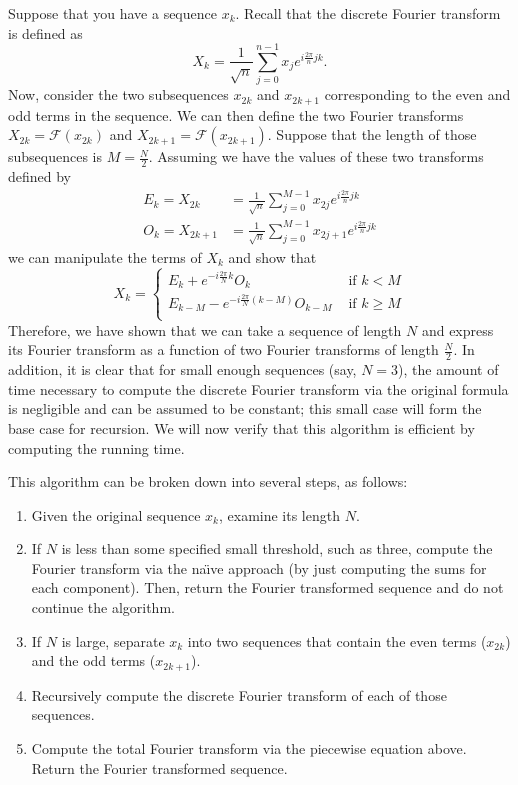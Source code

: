 \documentclass[11pt]{article}
\newcommand\del[1]{\left(#1\right)}
\newcommand\nicefrac[2]{\frac{#1}{#2}}
\newcommand\cF{\mathcal{F}}
\begin{document}
Suppose that you have a sequence $x_k$. Recall that the discrete Fourier transform is defined as
\[X_k = \frac{1}{\sqrt{n}} \sum_{j=0}^{n-1} x_j e^{i\frac{2\pi}{n} jk}.\]
Now, consider the two subsequences $x_{2k}$ and $x_{2k+1}$ corresponding to the even and odd terms
in the sequence. We can then define the two Fourier transforms $X_{2k} = \cF(x_{2k})$ and $X_{2k+1}
= \cF(x_{2k+1})$. Suppose that the length of those subsequences is $M=\nicefrac{N}{2}$. Assuming we
have the values of these two transforms defined by
\begin{align*}
    E_k = X_{2k} &= \frac{1}{\sqrt{n}} \sum_{j=0}^{M-1} x_{2j} e^{i\frac{2\pi}{n} jk} \\
    O_k = X_{2k+1} &= \frac{1}{\sqrt{n}} \sum_{j=0}^{M-1} x_{2j+1} e^{i\frac{2\pi}{n} jk}
\end{align*}
we can manipulate the terms of $X_k$ and show that
\[
    X_k = \begin{cases}
        E_k + e^{-i\frac{2\pi}{N}k}O_k & \text{\ if } k < M \\
        E_{k-M} - e^{-i\frac{2\pi}{N}\del{k-M}}O_{k-M} & \text{\ if } k \ge M \\
    \end{cases}
\]
Therefore, we have shown that we can take a sequence of length $N$ and express its Fourier transform
as a function of two Fourier transforms of length $\nicefrac{N}{2}$. In addition, it is clear that
for small enough sequences (say, $N=3$), the amount of time necessary to compute the discrete
Fourier transform via the original formula is negligible and can be assumed to be constant; this
small case will form the base case for recursion. We will now verify that this algorithm is
efficient by computing the running time.

This algorithm can be broken down into several steps, as follows:
\begin{enumerate}
    \item
        Given the original sequence $x_k$, examine its length $N$. 
    \item If $N$ is less than some specified small threshold, such as three, compute the
        Fourier transform via the na\"{\i}ve approach (by just computing the sums for each
        component).  Then, return the Fourier transformed sequence and do not continue the
        algorithm.
    \item If $N$ is large, separate $x_k$ into two sequences that contain the even terms
        ($x_{2k}$) and the odd terms ($x_{2k+1}$).
    \item
        Recursively compute the discrete Fourier transform of each of those sequences.
    \item
        Compute the total Fourier transform via the piecewise equation above. Return the Fourier
        transformed sequence.
\end{enumerate}
\end{document}
